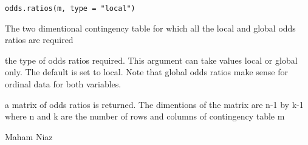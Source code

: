 \documentclass[letterpaper]{book}
\begin{document}
%
\begin{Usage}
\begin{verbatim}
odds.ratios(m, type = "local")
\end{verbatim}
\end{Usage}
%
\begin{Arguments}
\begin{ldescription}
\item[\code{m}] 
The two dimentional contingency table for which all the local and global odds ratios are required

\item[\code{type}] 
the type of odds ratios required. This argument can take values local or global only. The default is set to local.
Note that global odds ratios make sense for ordinal data for both variables. 

\end{ldescription}
\end{Arguments}
%
\begin{Value}
\begin{ldescription}
\item[\code{result}] a matrix of odds ratios is returned. The dimentions  of the matrix are n-1 by k-1 where n and k are the number of rows and columns of contingency table m
\end{ldescription}





\end{Value}
%
\begin{Author}\relax
Maham Niaz
\end{Author}
%
\end{document}
